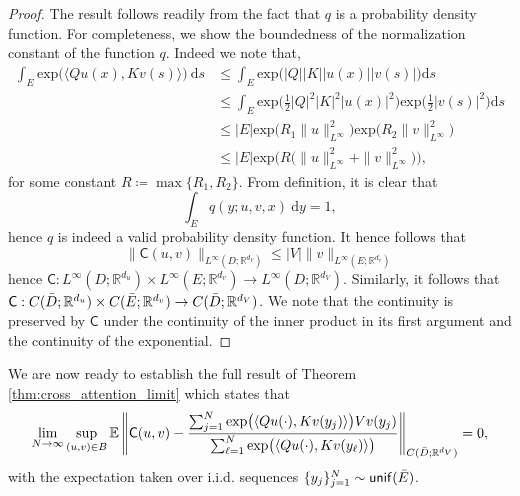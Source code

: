 \documentclass[twoside]{article}
\newcommand{\1}{\mathbbm{1}}
\newcommand{\R}{\mathbbm{R}}
\newcommand{\sC}{\mathsf{C}}
\providecommand{\mathbbm}{\mathbb} %
\newcommand{\E}{\mathbb{E}}
\newcommand{\unif}{\mathsf{unif}}
\begin{document}
\begin{proof}
    The result follows readily from the fact that $q$ is a probability density function. For completeness, we show the boundedness of the normalization constant of the function $q$. Indeed we note that,
\begin{align*}
    \int_E \mathrm{exp} \big ( \langle Q u(x), K v(s) \rangle \big ) \: \mathrm{d}s &\leq \int_E \mathrm{exp} \big ( |Q| |K| |u(x)| |v(s)| \big ) \mathrm{d}s \\
    &\leq \int_E \mathrm{exp} \bigg ( \frac{1}{2} |Q|^2 |K|^2 |u(x)|^2 \bigg ) \mathrm{exp} \bigg ( \frac{1}{2} |v(s)|^2 \bigg ) \mathrm{d}s \\
    &\leq |E| \mathrm{exp} \big ( R_1 \|u\|_{L^\infty}^2 \big ) \mathrm{exp} \big ( R_2 \|v\|_{L^\infty}^2 \big )\\
    &\leq |E| \mathrm{exp} \Big ( R \bigl(\|u\|_{L^\infty}^2 + \|v\|_{L^\infty}^2 \bigr)\Big ),
\end{align*}
for some constant \(R \coloneqq \max\{R_1,R_2\}\). From definition, it is clear that 
\[\int_E q(y; u,v,x) \: \mathrm{d}y = 1,\] 
hence \(q\) is indeed a valid probability density function. It hence follows that
\[\|\sC(u,v)\|_{L^\infty(D;\R^{d_V})} \leq |V|\|v\|_{L^\infty(E;\R^{d_v})}\]
hence \(\sC : L^\infty (D;\R^{d_u})\times L^\infty (E;\R^{d_v}) \to L^\infty (D; \R^{d_V})\). Similarly, it follows that
\(\sC : C (\Bar{D};\R^{d_u})\times C (\Bar{E};\R^{d_v}) \to C (\Bar{D}; \R^{d_V})\).  We note that the continuity is preserved by $\sC$ under the continuity of the inner product in its first argument and the continuity of the exponential.
\end{proof}
We are now ready to establish the full result of Theorem \ref{thm:cross_attention_limit} which states that 
\[ \lim_{N \to \infty} \sup_{(u,v) \in B} \E \left \| \sC(u,v) - \frac{\sum_{j=1}^N \mathrm{exp} \big ( \langle Qu(\cdot), Kv(y_j)  \rangle \big ) V v(y_j)}{\sum_{\ell=1}^N \mathrm{exp} \big ( \langle Qu(\cdot), Kv(y_\ell)  \rangle \big )} \right \|_{C(\Bar{D};\R^{d_V})}  = 0,\]
    with the expectation taken over i.i.d. sequences \(\{y_j\}_{j=1}^N \sim \unif(\Bar{E})\).
\end{document}
